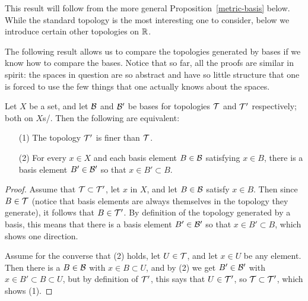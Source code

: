 This result will follow from the more general Proposition~\ref{metric-basis} below. While the standard topology is the most interesting one to consider, below we introduce certain other topologies on $\mathbb{R}$.

The following result allows us to compare the topologies generated by bases if we know how to compare the bases. Notice that so far, all the proofs are similar in spirit: the spaces in question are so abstract and have so little structure that one is forced to use the few things that one actually knows about the spaces.

\begin{lem}
  \label{compare-bases}
  Let $X$ be a set, and let $\mathcal{B}$ and $\mathcal{B}'$ be bases for topologies $\mathcal{T}$ and $\mathcal{T}'$ respectively; both on $X$s/. Then the following are equivalent:
  \begin{itemize}
    \item[(1)] The topology $\mathcal{T}'$ is finer than $\mathcal{T}$.
    \item[(2)] For every $x \in X$ and each basis element $B \in \mathcal{B}$ satisfying $x \in B$, there is a basis element $B' \in \mathcal{B}'$ so that $x \in B' \subset B$.
  \end{itemize}
\end{lem}

\begin{proof}
  Assume that $\mathcal{T} \subset \mathcal{T}'$, let $x$ in $X$, and let $B \in \mathcal{B}$ satisfy $x \in B$. Then since $B \in \mathcal{T}$ (notice that basis elements are always themselves in the topology they generate), it follows that $B \in \mathcal{T}'$. By definition of the topology generated by a basis, this means that there is a basis element $B' \in \mathcal{B}'$ so that $x \in B' \subset B$, which shows one direction.
  
  Assume for the converse that (2) holds, let $U \in \mathcal{T}$, and let $x \in U$ be any element. Then there is a $B \in \mathcal{B}$ with $x \in B \subset U$, and by (2) we get $B' \in \mathcal{B}'$ with $x \in B' \subset B \subset U$, but by definition of $\mathcal{T}'$, this says that $U \in \mathcal{T}'$, so $\mathcal{T} \subset \mathcal{T}'$, which shows (1).
\end{proof}

